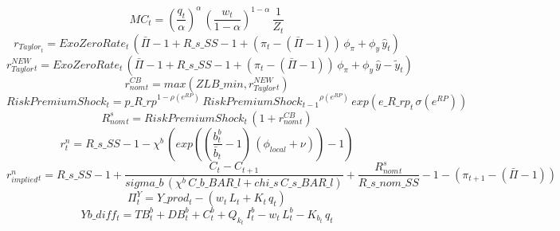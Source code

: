 \begin{dmath}
{MC_{t}}=\left(\frac{{q_{t}}}{{\alpha }}\right)^{{\alpha }}\, \left(\frac{{w_{t}}}{1-{\alpha }}\right)^{1-{\alpha }}\, \frac{1}{{Z_{t}}}
\end{dmath}
\begin{dmath}
{ r_{Taylor} _{t}}={ExoZeroRate_{t}}\, \left({ \bar{\Pi} }-1+{R\_s\_SS}-1+\left({ \pi _{t}}-\left({ \bar{\Pi} }-1\right)\right)\, {\phi_{\pi}}+{\phi_{y}}\, { \hat{y} _{t}}\right)
\end{dmath}
\begin{dmath}
{ r_{Taylor}^{NEW} _{t}}={ExoZeroRate_{t}}\, \left({ \bar{\Pi} }-1+{R\_s\_SS}-1+\left({ \pi _{t}}-\left({ \bar{\Pi} }-1\right)\right)\, {\phi_{\pi}}+{\phi_{y}}\, { \hat{y} - \tilde{y} _{t}}\right)
\end{dmath}
\begin{dmath}
{ r^{CB}_{nom}_{t}}=max({ZLB\_min},{ r_{Taylor}^{NEW} _{t}})
\end{dmath}
\begin{dmath}
{ Risk Premium Shock _{t}}={p\_R\_rp}^{1-{\rho(e^{RP}) }}\, { Risk Premium Shock _{t-1}}^{{\rho(e^{RP}) }}\, exp\left({e\_R\_rp_{t}}\, {\sigma(e^{RP}) }\right)
\end{dmath}
\begin{dmath}
{ R^s_{nom}_{t}}={ Risk Premium Shock _{t}}\, \left(1+{ r^{CB}_{nom}_{t}}\right)
\end{dmath}
\begin{dmath}
{ r^n _{t}}={R\_s\_SS}-1-{\chi^b }\, \left(exp\left(\left(\frac{{b^b_{t}}}{{ \bar{b} _{t}}}-1\right)\, \left({\phi_{local}}+{\nu }\right)\right)-1\right)
\end{dmath}
\begin{dmath}
{r^n_{implied}_{t}}={R\_s\_SS}-1+\frac{{C_{t}}-{C_{t+1}}}{{sigma\_b}\, \left({\chi^b }\, {C\_b\_BAR\_l}+{chi\_s}\, {C\_s\_BAR\_l}\right)}+\frac{{ R^s_{nom}_{t}}}{{R\_s\_nom\_SS}}-1-\left({ \pi _{t+1}}-\left({ \bar{\Pi} }-1\right)\right)
\end{dmath}
\begin{dmath}
{\Pi^Y_{t}}={Y\_prod_{t}}-\left({w_{t}}\, {L_{t}}+{K_{t}}\, {q_{t}}\right)
\end{dmath}
\begin{dmath}
{Yb\_diff_{t}}={TB^b_{t}}+{DB^b_{t}}+{C^b_{t}}+{ Q_k _{t}}\, {I^b_{t}}-{w_{t}}\, {L^b_{t}}-{K_b_{t}}\, {q_{t}}
\end{dmath}
